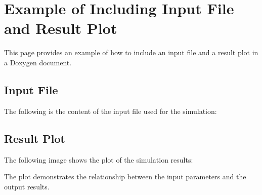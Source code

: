 \section*{Example of Including Input File and Result Plot}

This page provides an example of how to include an input file and a result plot in a Doxygen document.

\subsection*{Input File}

The following is the content of the input file used for the simulation\-:


\begin{DoxyCodeInclude}
\end{DoxyCodeInclude}
 
\begin{DoxyCodeInclude}
\end{DoxyCodeInclude}


\subsection*{Result Plot}

The following image shows the plot of the simulation results\-:



The plot demonstrates the relationship between the input parameters and the output results. 